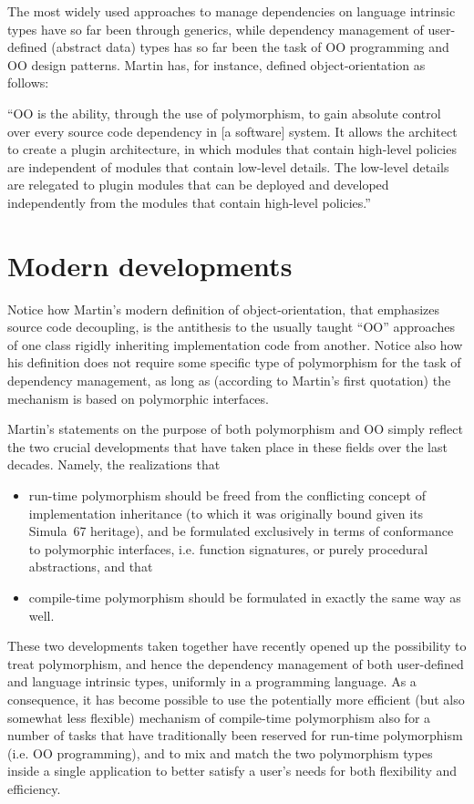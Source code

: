 \documentclass[11pt,oneside]{report}
\begin{document}
The most widely used approaches to manage dependencies on language
intrinsic types have so far been through generics, while dependency
management of user-defined (abstract data) types has so far been the
task of OO programming and OO design patterns. Martin \cite{Martin_17}
has, for instance, defined object-orientation as follows:

\begin{displayquote}
  ``OO is the ability, through the use of polymorphism, to gain
  absolute control over every source code dependency in [a software]
  system. It allows the architect to create a plugin architecture, in
  which modules that contain high-level policies are independent of
  modules that contain low-level details. The low-level details are
  relegated to plugin modules that can be deployed and developed
  independently from the modules that contain high-level policies.''
\end{displayquote}

\section{Modern developments}

Notice how Martin's modern definition of object-orientation, that
emphasizes source code decoupling, is the antithesis to the usually
taught ``OO'' approaches of one class rigidly inheriting
implementation code from another. Notice also how his definition does
not require some specific type of polymorphism for the task of
dependency management, as long as (according to Martin's first
quotation) the mechanism is based on polymorphic interfaces.

Martin's statements on the purpose of both polymorphism and OO simply
reflect the two crucial developments that have taken place in these
fields over the last decades. Namely, the realizations that
\begin{itemize}
\item
  run-time polymorphism should be freed from the conflicting concept
  of implementation inheritance (to which it was originally bound
  given its Simula~67 heritage), and be formulated exclusively in
  terms of conformance to polymorphic interfaces, i.e. function
  signatures, or purely procedural abstractions, and that
\item
  compile-time polymorphism should be formulated in exactly the same
  way as well.
\end{itemize}

These two developments taken together have recently opened up the
possibility to treat polymorphism, and hence the dependency management
of both user-defined and language intrinsic types, uniformly in a
programming language. As a consequence, it has become possible to use
the potentially more efficient (but also somewhat less flexible)
mechanism of compile-time polymorphism also for a number of tasks that
have traditionally been reserved for run-time polymorphism (i.e. OO
programming), and to mix and match the two polymorphism types inside a
single application to better satisfy a user's needs for both
flexibility and efficiency.
\end{document}
